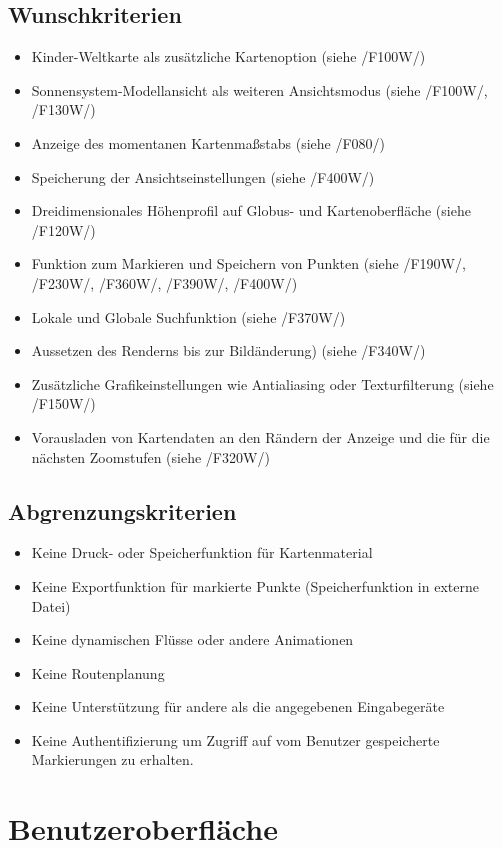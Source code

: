 \documentclass[10pt]{scrreprt}
\newcommand{\ziel}[1]{{\fontsize{9.5}{11}\textsf{/#1/}}}
\begin{document}
\section{Wunschkriterien}
\begin{itemize}
\item Kinder-Weltkarte als zusätzliche Kartenoption (siehe \ziel{F100W})
\item Sonnensystem-Modellansicht als weiteren Ansichtsmodus (siehe \ziel{F100W}, \ziel{F130W})
\item Anzeige des momentanen Kartenmaßstabs (siehe \ziel{F080})
\item Speicherung der Ansichtseinstellungen (siehe \ziel{F400W})
\item Dreidimensionales Höhenprofil auf Globus- und Kartenoberfläche (siehe \ziel{F120W})
\item Funktion zum Markieren und Speichern von Punkten (siehe \ziel{F190W}, \ziel{F230W}, \ziel{F360W}, \ziel{F390W}, \ziel{F400W})
\item Lokale und Globale Suchfunktion (siehe \ziel{F370W})
\item Aussetzen des Renderns bis zur Bildänderung) (siehe \ziel{F340W})
\item Zusätzliche Grafikeinstellungen wie Antialiasing oder Texturfilterung (siehe \ziel{F150W})
\item Vorausladen von Kartendaten an den Rändern der Anzeige und die für die nächsten Zoomstufen (siehe \ziel{F320W})
\end{itemize}

\section{Abgrenzungskriterien}
\begin{itemize}
\item Keine Druck- oder Speicherfunktion für Kartenmaterial
\item Keine Exportfunktion für markierte Punkte (Speicherfunktion in externe Datei)
\item Keine dynamischen Flüsse oder andere Animationen
\item Keine Routenplanung
\item Keine Unterstützung für andere als die angegebenen Eingabegeräte
\item Keine Authentifizierung um Zugriff auf vom Benutzer gespeicherte Markierungen zu erhalten.
\end{itemize}


\chapter{Benutzeroberfläche}
\end{document}
